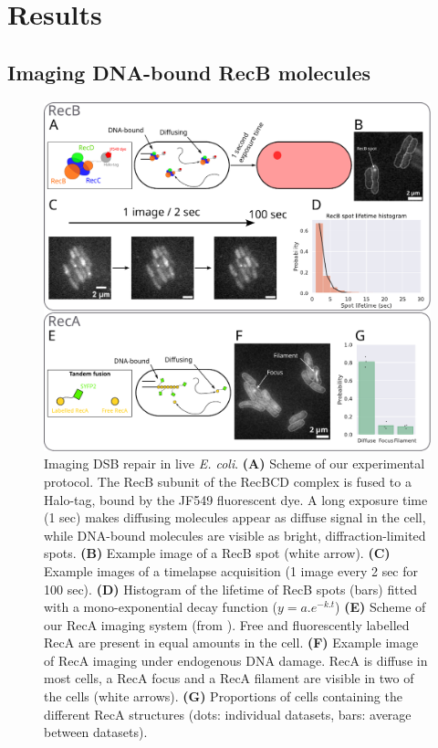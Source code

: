 \section*{Results}

\subsection*{Imaging DNA-bound RecB molecules}

\begin{figure}[htbp]
    \centering
    \includegraphics[width=.8\textwidth]{Figures/Fig1_endogenous.pdf}
    \caption{Imaging DSB repair in live \textit{E. coli}. \textbf{(A)} Scheme of our experimental protocol. The RecB subunit of the RecBCD complex is fused to a Halo-tag, bound by the JF549 fluorescent dye. A long exposure time (1 sec) makes diffusing molecules appear as diffuse signal in the cell, while DNA-bound molecules are visible as bright, diffraction-limited spots. \textbf{(B)} Example image of a RecB spot (white arrow). \textbf{(C)} Example images of a timelapse acquisition (1 image every 2 sec for 100 sec). \textbf{(D)} Histogram of the lifetime of RecB spots (bars) fitted with a mono-exponential decay function ($y=a.e^{-k.t}$) \textbf{(E)} Scheme of our RecA imaging system (from \cite{Wiktor2021}). Free and fluorescently labelled RecA are present in equal amounts in the cell. \textbf{(F)} Example image of RecA imaging under endogenous DNA damage. RecA is diffuse in most cells, a RecA focus and a RecA filament are visible in two of the cells (white arrows). \textbf{(G)} Proportions of cells containing the different RecA structures (dots: individual datasets, bars: average between datasets).}
    \label{Fig:endogenous}
\end{figure}

